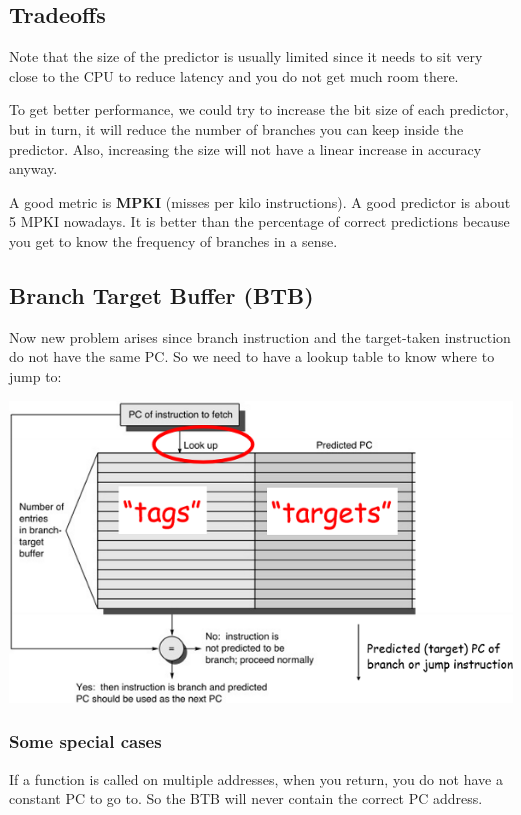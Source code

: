 \documentclass[letterpaper,12pt]{article}
\begin{document}
\subsection{Tradeoffs}
Note that the size of the predictor is usually limited since it needs to sit very close to the CPU to reduce latency and you do not get much room there.

To get better performance, we could try to increase the bit size of each predictor, but in turn, it will reduce the number of branches you can keep inside the predictor. Also, increasing the size will not have a linear increase in accuracy anyway.

A good metric is \textbf{MPKI} (misses per kilo instructions). A good predictor is about 5 MPKI nowadays. It is better than the percentage of correct predictions because you get to know the frequency of branches in a sense.

\subsection{Branch Target Buffer (BTB)}
Now new problem arises since branch instruction and the target-taken instruction do not have the same PC. So we need to have a lookup table to know where to jump to:

\includegraphics*[scale = 0.7]{./Image/BTB.png}

\subsubsection{Some special cases}

If a function is called on multiple addresses, when you return, you do not have a constant PC to go to. So the BTB will never contain the correct PC address.
\end{document}
